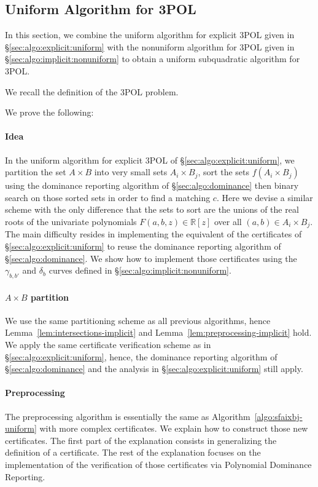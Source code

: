 \subsection{Uniform Algorithm for 3POL}%
\label{sec:algo:implicit:uniform}

In this section, we combine the uniform algorithm for explicit 3POL given in
\S\ref{sec:algo:explicit:uniform} with the nonuniform algorithm for
3POL given in \S\ref{sec:algo:implicit:nonuniform} to obtain a uniform
subquadratic algorithm for 3POL\@.

We recall the definition of the 3POL problem.
\ProblemPOLImplicit*

We prove the following:
\restate{\TheoremPOLUniformImplicit*}

\paragraph{Idea}
In the uniform algorithm for explicit 3POL of
\S\ref{sec:algo:explicit:uniform}, we partition the set $A \times B$
into very small sets $A_i \times B_j$, sort the sets $f(A_i \times B_j)$ using
the dominance reporting algorithm of \S\ref{sec:algo:dominance} then
binary search on those sorted sets in order to find a matching $c$.
%
Here we devise a similar scheme with the only difference that the sets to sort
are the unions of the real roots of the univariate polynomials
$F(a,b,z)\in\mathbb{R}[z]$ over all $(a,b) \in A_i \times B_j$.
%
The main difficulty resides in implementing the
equivalent of the certificates of \S\ref{sec:algo:explicit:uniform} to reuse
the dominance reporting algorithm of \S\ref{sec:algo:dominance}. We show how to
implement those certificates using the $\gamma_{b,b'}$ and $\delta_b$ curves
defined in \S\ref{sec:algo:implicit:nonuniform}.

\paragraph{$A \times B$ partition}
We use the same partitioning scheme as all previous
algorithms, hence Lemma~\ref{lem:intersections-implicit} and
Lemma~\ref{lem:preprocessing-implicit} hold. We apply the same certificate verification
scheme as in \S\ref{sec:algo:explicit:uniform}, hence, the dominance
reporting algorithm of \S\ref{sec:algo:dominance} and the analysis
in \S\ref{sec:algo:explicit:uniform} still apply.

\paragraph{Preprocessing}
The preprocessing algorithm is essentially the same as
Algorithm~\ref{algo:sfaixbj-uniform} with more complex certificates. We explain how to
construct those new certificates. The first part of the explanation consists in
generalizing the definition of a certificate. The rest of the
explanation focuses on the implementation of the verification of those
certificates via Polynomial Dominance Reporting.

